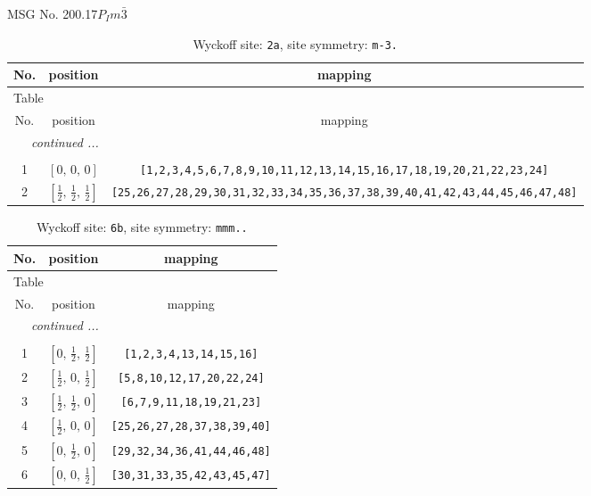 \documentclass[fleqn,8pt]{jsarticle}
\begin{document}
\setcounter{MaxMatrixCols}{32}

\renewcommand{\tablename}{Table~}
\renewcommand{\figurename}{Figure~}
\begin{center}
\LARGE
MSG No. 200.17\quad$P_{I}m\bar{3}$
\end{center}
\renewcommand{\arraystretch}{1.2}
\begin{longtable}{ccc}
\caption{Wyckoff site: {\tt 2a}, site symmetry: {\tt m-3.}}
 \\
 \hline \hline
No. & position & mapping \\ \hline \endfirsthead

\multicolumn{2}{l}{\tablename\ \thetable{}} \\
 \hline \hline
No. & position & mapping \\ \hline \endhead

 \hline \hline
\multicolumn{2}{r}{\footnotesize\it continued ...} \\ \endfoot

 \hline \hline
\multicolumn{2}{r}{} \\ \endlastfoot

1 & $\left[ 0,\, 0,\, 0 \right]$ & {\tt [1,2,3,4,5,6,7,8,9,10,11,12,13,14,15,16,17,18,19,20,21,22,23,24]} \\ \hline
2 & $\left[ \frac{1}{2},\, \frac{1}{2},\, \frac{1}{2} \right]$ & {\tt [25,26,27,28,29,30,31,32,33,34,35,36,37,38,39,40,41,42,43,44,45,46,47,48]} \\
\end{longtable}
\renewcommand{\arraystretch}{1.2}
\begin{longtable}{ccc}
\caption{Wyckoff site: {\tt 6b}, site symmetry: {\tt mmm..}}
 \\
 \hline \hline
No. & position & mapping \\ \hline \endfirsthead

\multicolumn{2}{l}{\tablename\ \thetable{}} \\
 \hline \hline
No. & position & mapping \\ \hline \endhead

 \hline \hline
\multicolumn{2}{r}{\footnotesize\it continued ...} \\ \endfoot

 \hline \hline
\multicolumn{2}{r}{} \\ \endlastfoot

1 & $\left[ 0,\, \frac{1}{2},\, \frac{1}{2} \right]$ & {\tt [1,2,3,4,13,14,15,16]} \\ \hline
2 & $\left[ \frac{1}{2},\, 0,\, \frac{1}{2} \right]$ & {\tt [5,8,10,12,17,20,22,24]} \\ \hline
3 & $\left[ \frac{1}{2},\, \frac{1}{2},\, 0 \right]$ & {\tt [6,7,9,11,18,19,21,23]} \\ \hline
4 & $\left[ \frac{1}{2},\, 0,\, 0 \right]$ & {\tt [25,26,27,28,37,38,39,40]} \\ \hline
5 & $\left[ 0,\, \frac{1}{2},\, 0 \right]$ & {\tt [29,32,34,36,41,44,46,48]} \\ \hline
6 & $\left[ 0,\, 0,\, \frac{1}{2} \right]$ & {\tt [30,31,33,35,42,43,45,47]} \\
\end{longtable}
\end{document}
